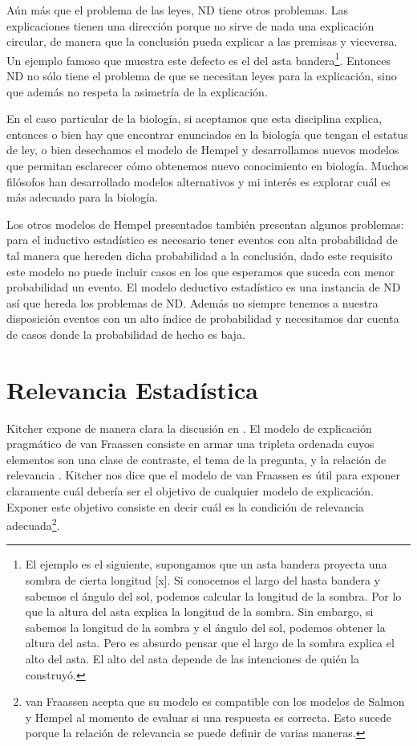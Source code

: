 Aún más que el problema de las leyes, ND tiene otros problemas. Las explicaciones tienen una dirección porque no sirve de nada una explicación circular, de manera que la conclusión pueda explicar a las premisas y viceversa. Un ejemplo famoso que muestra este defecto es el del asta bandera\footnote{El ejemplo es el siguiente, supongamos que un asta bandera proyecta una sombra de cierta longitud [x]. Si conocemos el largo del hasta bandera y sabemos el ángulo del sol, podemos calcular la longitud de la sombra. Por lo que la altura del asta explica la longitud de la sombra. Sin embargo, si sabemos la longitud de la sombra y el ángulo del sol, podemos obtener la altura del asta. Pero es absurdo pensar que el largo de la sombra explica el alto del asta. El alto del asta depende de las intenciones de quién la construyó.}. Entonces ND no sólo tiene el problema de que se necesitan leyes para la explicación, sino que además no respeta la asimetría de la explicación.

En el caso particular de la biología, si aceptamos que esta disciplina explica, entonces o bien hay que encontrar enunciados en la biología que tengan el estatus de ley, o bien  desechamos el modelo de Hempel y desarrollamos nuevos modelos que permitan esclarecer cómo obtenemos nuevo conocimiento en biología. Muchos filósofos han desarrollado modelos alternativos y mi interés es explorar cuál es más adecuado para la biología.

Los otros modelos de Hempel presentados también presentan algunos problemas: para el inductivo estadístico es necesario tener eventos con alta probabilidad de tal manera que hereden dicha probabilidad a la conclusión, dado este requisito este modelo no puede incluir casos en los que esperamos que suceda con menor probabilidad un evento. El modelo deductivo estadístico es una instancia de ND así que hereda los problemas de ND.  Además no siempre tenemos a nuestra disposición eventos con un alto índice de probabilidad y necesitamos dar cuenta de casos donde la probabilidad de hecho es baja.

\section{Relevancia Estadística}

\noindent Kitcher expone de manera clara la discusión en \citeyear{Kitcher2002}. El modelo de explicación pragmático de van Fraassen consiste en armar una tripleta ordenada cuyos elementos son una clase de contraste, el tema de la pregunta, y la relación de relevancia \cite{Fraassen1977}. Kitcher nos dice que el modelo de van Fraassen es útil para exponer claramente cuál debería ser el objetivo de cualquier modelo de explicación. Exponer este objetivo consiste en decir cuál es la condición de relevancia adecuada\footnote{van Fraassen acepta que su modelo es compatible con los modelos de Salmon y Hempel al momento de evaluar si una respuesta es correcta. Esto sucede porque la relación de relevancia se puede definir de varias maneras\cite{Fraassen}.}.

